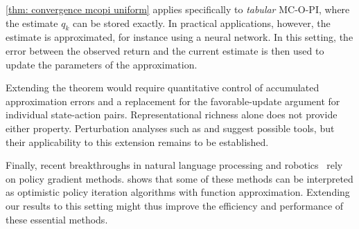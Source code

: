 \documentclass[twoside,11pt]{article}
\DeclareRobustCommand{\reviewbarstart}{%
  \ifhmode %
    \vadjust{\vbox to 0pt{%
      \vskip-\ht\strutbox %
      \vskip-\dp\strutbox %
      \cbstart[\changebarwidth] %
      \vss %
    }}%
  \else %
    \cbstart[\changebarwidth]%
  \fi %
} %
\providecommand{\DIFadd}[1]{#1} %
\providecommand{\DIFaddbegin}{\reviewbarstart} %
\providecommand{\DIFaddend}{\protect\cbend} %
\def\DIFadd#1{#1}%
\def\DIFaddbegin{}%
\def\DIFaddend{}%
\begin{document}
\autoref{thm: convergence mcopi uniform} applies specifically to \textit{tabular} MC-O-PI, where the estimate $q_k$ can be stored exactly.
In practical applications, however, the estimate is approximated, for instance using a neural network.
In this setting, the error between the observed return and the current estimate is then used to update the parameters of the approximation.

 \DIFaddbegin \DIFadd{Extending the theorem would require quantitative control of accumulated approximation errors and a replacement for the favorable-update argument for individual state-action pairs. Representational richness alone does not provide either property. Perturbation analyses such as \citet[Section~4.3.3]{Bertsekas1996Neuro-DynamicProgramming} and \citet[Section~5.2]{Kushner2003StochasticApplications} suggest possible tools, but their applicability to this extension remains to be established}\DIFaddend .



Finally, recent breakthroughs in natural language processing and robotics~\citep{Schulman2017ProximalAlgorithms} rely on policy gradient methods.
\citet{Wagner2013OptimisticResult} shows that some of these methods can be interpreted as optimistic policy iteration algorithms with function approximation.
Extending our results to this setting might thus improve the efficiency and performance of these essential methods.


\end{document}
